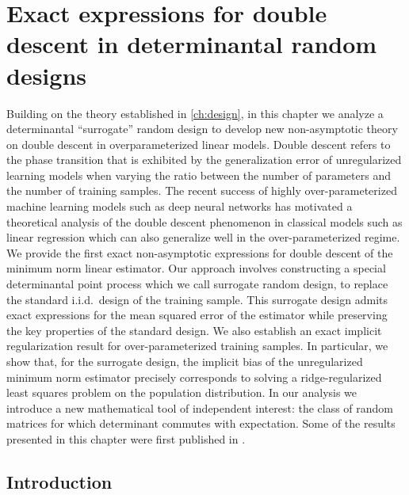 \documentclass[../../thesis.tex]{subfiles}
\begin{document}


\chapter{Exact expressions for double descent in determinantal random designs}
\label{ch:double_descent}

Building on the theory established in \cref{ch:design}, in this chapter
we analyze a determinantal ``surrogate'' random design to develop new
non-asymptotic theory on double descent in overparameterized linear models.
Double descent refers to the phase transition that is exhibited by
the generalization error of unregularized learning models when varying the ratio
between the number of parameters and the number of training
samples. The recent success of highly over-parameterized machine learning
models such as deep neural networks has motivated a theoretical analysis of
the double descent phenomenon in classical models such as linear
regression which can also generalize well in the over-parameterized
regime. We provide the first exact non-asymptotic
expressions for double descent of the minimum norm linear
estimator. Our approach involves constructing a special
determinantal point process  which we call surrogate random
design, to replace the standard i.i.d.~design of the training
sample. This surrogate design admits exact expressions for the mean
squared error of the estimator while preserving the key properties
of the standard design. We also establish an exact implicit
regularization result for over-parameterized training samples. In
particular, we show that, for the surrogate design, the implicit bias
of the unregularized minimum norm estimator precisely corresponds to
solving a ridge-regularized least squares problem on the population
distribution. In our analysis we introduce a new mathematical tool of
independent interest: the class of random matrices for which
determinant commutes with expectation.
Some of the results presented in this chapter were first published
in .



\section{Introduction}
\end{document}
